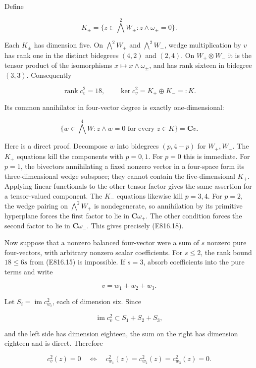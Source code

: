 Define

\[
 K_\pm=\{z\in\bigwedge^2W_\pm:z\wedge\omega_\pm=0\}.
\]

Each \(K_\pm\) has dimension five. On \(\bigwedge^2W_+\) and
\(\bigwedge^2W_-\), wedge multiplication by \(v\) has rank one in the
distinct bidegrees \((4,2)\) and \((2,4)\). On \(W_+\otimes W_-\) it is
the tensor product of the isomorphisms \(x\mapsto x\wedge\omega_\pm\),
and has rank sixteen in bidegree \((3,3)\). Consequently

\[
 \operatorname{rank}c_v^2=18,
 \qquad\ker c_v^2=K_+\oplus K_-=:K.
 \tag{E816.17}
\]

Its common annihilator in four-vector degree is exactly one-dimensional:

\[
 \{w\in\bigwedge^4W:z\wedge w=0\text{ for every }z\in K\}
       =\mathbf C v.
 \tag{E816.18}
\]

Here is a direct proof. Decompose \(w\) into bidegrees \((p,4-p)\) for
\(W_+,W_-\). The \(K_+\) equations kill the components with \(p=0,1\).
For \(p=0\) this is immediate. For \(p=1\), the bivectors annihilating a
fixed nonzero vector in a four-space form its three-dimensional wedge
subspace; they cannot contain the five-dimensional \(K_+\). Applying
linear functionals to the other tensor factor gives the same assertion
for a tensor-valued component. The \(K_-\) equations likewise kill
\(p=3,4\). For \(p=2\), the wedge pairing on \(\bigwedge^2W_+\) is
nondegenerate, so annihilation by its primitive hyperplane forces the
first factor to lie in \(\mathbf C\omega_+\). The other condition forces
the second factor to lie in \(\mathbf C\omega_-\). This gives precisely
(E816.18).

Now suppose that a nonzero balanced four-vector were a sum of \(s\)
nonzero pure four-vectors, with arbitrary nonzero scalar coefficients.
For \(s\le2\), the rank bound \(18\le6s\) from (E816.15) is impossible.
If \(s=3\), absorb coefficients into the pure terms and write

\[
 v=w_1+w_2+w_3.
\]

Let \(S_i=\operatorname{im}c_{w_i}^2\), each of dimension six. Since

\[
 \operatorname{im}c_v^2\subset S_1+S_2+S_3,
\]

and the left side has dimension eighteen, the sum on the right has
dimension eighteen and is direct. Therefore

\[
 c_v^2(z)=0
 \quad\Longleftrightarrow\quad
 c_{w_1}^2(z)=c_{w_2}^2(z)=c_{w_3}^2(z)=0.
 \tag{E816.19}
\]

